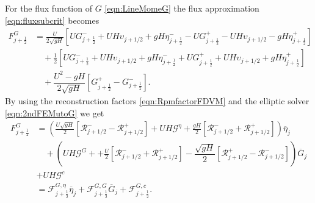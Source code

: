 For the flux function of $G$ \eqref{eqn:LineMomeG} the flux approximation \eqref{eqn:fluxsubcrit} becomes
\begin{align}
F^G_{j+\frac{1}{2}} &= \frac{U}{2 \sqrt{gH}} \left[ UG^-_{j+\frac{1}{2}} + UH \upsilon_{j+1/2} + gH\eta^-_{j+\frac{1}{2}} - UG^+_{j+\frac{1}{2}} - UH \upsilon_{j+1/2} - gH\eta^+_{j+\frac{1}{2}}  \right]   \nonumber \\ & \quad + \frac{1}{2}\left[UG^-_{j+\frac{1}{2}} + UH \upsilon_{j+1/2} + gH\eta^-_{j+\frac{1}{2}} + UG^+_{j+\frac{1}{2}} + UH \upsilon_{j+1/2} + gH\eta^+_{j+\frac{1}{2}}\right] \nonumber \\ & \quad+ \dfrac{U^2 - gH}{2\sqrt{g H}} \left [ G^+_{j+\frac{1}{2}} - G^-_{j+\frac{1}{2}} \right ].
\end{align}
By using the reconstruction factors \eqref{eqn:RpmfactorFDVM} and the elliptic solver \eqref{eqn:2ndFEMutoG} we get
\begin{align}
F^G_{j+\frac{1}{2}} &= \left(\frac{U\sqrt{gH}}{2} \left[ \mathcal{R}^-_{j+1/2} - \mathcal{R}^+_{j+1/2}  \right] + UH\mathcal{G}^{\eta} + \frac{gH}{2} \left[ \mathcal{R}^-_{j+1/2} +\mathcal{R}^+_{j+1/2} \right]   \right)\overline{\eta}_j \nonumber \\ & \quad+ \left(UH\mathcal{G}^{G} + + \frac{U}{2} \left[ \mathcal{R}^-_{j+1/2} +\mathcal{R}^+_{j+1/2} \right] - \dfrac{\sqrt{g H}}{2} \left [\mathcal{R}^+_{j+1/2} - \mathcal{R}^-_{j+1/2} \right ]   \right) \overline{G}_j \nonumber \\ &+ UH\mathcal{G}^{c}  \nonumber \\
& = \mathcal{F}^{G, \eta}_{j+\frac{1}{2}} \overline{\eta}_{j} + \mathcal{F}^{G, G}_{j+\frac{1}{2}} \overline{G}_{j} + \mathcal{F}^{G, c}_{j+\frac{1}{2}}   .
\label{eqn:FluxfactorsubcritG}
\end{align}




